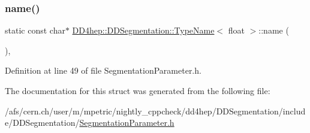 \subsubsection{\texorpdfstring{name()}{name()}}
{\footnotesize\ttfamily static const char$\ast$ \hyperlink{struct_d_d4hep_1_1_d_d_segmentation_1_1_type_name}{D\+D4hep\+::\+D\+D\+Segmentation\+::\+Type\+Name}$<$ float $>$\+::name (\begin{DoxyParamCaption}{ }\end{DoxyParamCaption})\hspace{0.3cm}{\ttfamily [inline]}, {\ttfamily [static]}}



Definition at line 49 of file Segmentation\+Parameter.\+h.



The documentation for this struct was generated from the following file\+:\begin{DoxyCompactItemize}
\item 
/afs/cern.\+ch/user/m/mpetric/nightly\+\_\+cppcheck/dd4hep/\+D\+D\+Segmentation/include/\+D\+D\+Segmentation/\hyperlink{_segmentation_parameter_8h}{Segmentation\+Parameter.\+h}\end{DoxyCompactItemize}
